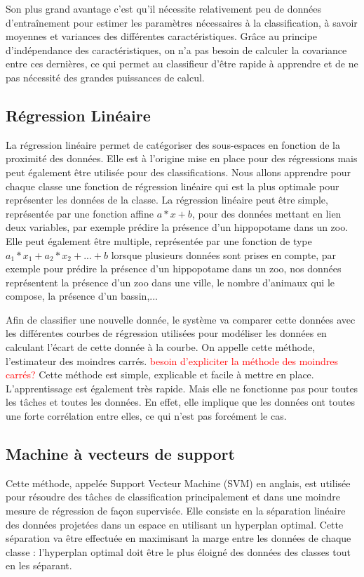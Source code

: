 Son plus grand avantage c'est qu'il nécessite relativement peu de données d'entraînement pour estimer les paramètres nécessaires à la classification, à savoir moyennes et variances des différentes caractéristiques. Grâce au principe d'indépendance des caractéristiques, on n'a pas besoin de calculer la covariance entre ces dernières, ce qui permet au classifieur d'être rapide à apprendre et de ne pas nécessité des grandes puissances de calcul.

\subsection{Régression Linéaire}
La régression linéaire permet de catégoriser des sous-espaces en fonction de la proximité des données. Elle est à l'origine mise en place pour des régressions mais peut également être utilisée pour des classifications. Nous allons apprendre  pour chaque classe une fonction de régression linéaire qui est la plus optimale pour représenter les données de la classe. La régression linéaire peut être simple, représentée par une fonction affine $a*x+b$, pour des données mettant en lien deux variables, par exemple prédire la présence d'un hippopotame dans un zoo. Elle peut également être multiple, représentée par une fonction de type $a_1*x_1 + a_2*x_2 +... + b$  lorsque plusieurs données sont prises en compte, par exemple pour prédire la présence d'un hippopotame dans un zoo, nos données représentent la présence d'un zoo dans une ville, le nombre d'animaux qui le compose, la présence d'un bassin,...

Afin de classifier une nouvelle donnée, le système va comparer cette données avec les différentes courbes de régression utilisées pour modéliser les données en calculant l'écart de cette donnée à la courbe. On appelle cette méthode, l'estimateur des moindres carrés.
\textcolor{red}{besoin d'expliciter la méthode des moindres carrés?}
Cette méthode est simple, explicable et facile à mettre en place. L'apprentissage est également très rapide. Mais elle ne fonctionne pas pour toutes les tâches et toutes les données. En effet, elle implique que les données ont toutes une forte corrélation entre elles, ce qui n'est pas forcément le cas.

\subsection{Machine à vecteurs de support}
Cette méthode, appelée Support Vecteur Machine (SVM) en anglais, est utilisée pour résoudre des tâches de classification principalement et dans une moindre mesure de régression de façon supervisée. Elle consiste en la séparation linéaire des données projetées dans un espace en utilisant un hyperplan optimal. Cette séparation va être effectuée en maximisant la marge entre les données de chaque classe : l'hyperplan optimal doit être le plus éloigné des données des classes tout en les séparant.

